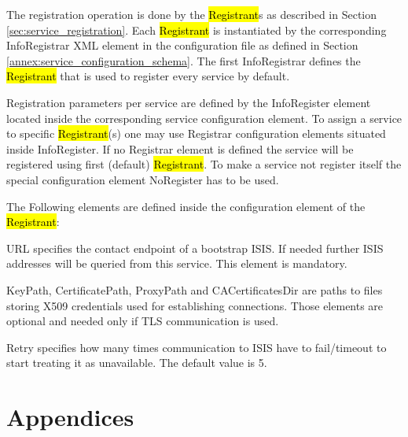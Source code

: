 \documentclass{book}
\begin{document}
The registration operation is done by the \hl{Registrant}s as described in Section \ref{sec:service_registration}.
Each \hl{Registrant} is instantiated by the corresponding InfoRegistrar XML element in the configuration file as 
defined in Section \ref{annex:service_configuration_schema}. The first InfoRegistrar defines the \hl{Registrant} 
that is used to register every service by default.

Registration parameters per service are defined by the InfoRegister element located inside the corresponding 
service configuration element. To assign a service to specific \hl{Registrant}(s) one may use Registrar 
configuration elements situated inside InfoRegister. If no Registrar element is defined the service will 
be registered using first (default) \hl{Registrant}. To make a service not register itself the special configuration element 
NoRegister has to be used.

The Following elements are defined inside the configuration element of the \hl{Registrant}:
\begin{description}
\item{URL} specifies the contact endpoint of a bootstrap ISIS. If needed further ISIS addresses will be 
queried from this service. This element is mandatory.
\item{KeyPath, CertificatePath, ProxyPath and CACertificatesDir} are paths to files storing X509 
credentials used for establishing connections. Those elements are optional and needed only if 
TLS communication is used.
\item{Retry} specifies how many times communication to ISIS have to fail/timeout to start treating it
as unavailable. The default value is 5.
\end{description}




\chapter{Appendices}
\end{document}
